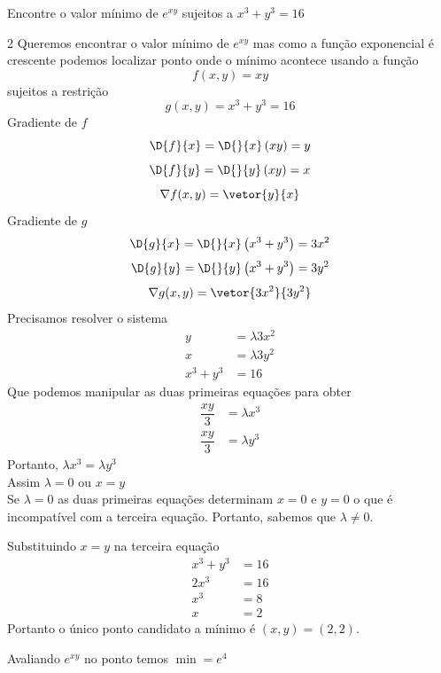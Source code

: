 \documentclass[a4paper,12pt,fleqn]{article}
\begin{document}
Encontre o valor mínimo de
\(
  e^{xy}
\)
sujeitos a
\(
  x^3 + y^3 = 16
\)
\clearpagequestiononly

\begin{answer}
  \setlength\columnsep{3em}
  \begin{multicols}{2}
    Queremos encontrar o valor mínimo de $e^{xy}$
    mas como a função exponencial é crescente podemos localizar  ponto
    onde o mínimo acontece usando a função
    \[
      f(x,y) = xy
    \]
    sujeitos a restrição
    \[
      g(x, y) = x^3 + y^3 = 16
    \]
    Gradiente de $f$
    \[
      \D{f}{x}
      = \D{}{x}\left(xy\right)
      = y
    \]
    \[
      \D{f}{y}
      = \D{}{y}\left(xy\right)
      = x
    \]
    \[
      \nabla f(x, y) = \vetor{y}{x}
    \]
    Gradiente de $g$
    \[
      \D{g}{x}
      = \D{}{x}\left(x^3 + y^3\right)
      = 3x^2
    \]
    \[
      \D{g}{y}
      = \D{}{y}\left(x^3 + y^3\right)
      = 3y^2
    \]
    \[
      \nabla g(x, y) = \vetor{3x^2}{3y^2}
    \]
    Precisamos resolver o sistema
    \begin{align*}
      y         & = \lambda 3x^2 \\
      x         & = \lambda 3y^2 \\
      x^3 + y^3 & = 16
    \end{align*}
    Que podemos manipular as duas primeiras equações para obter
    \begin{align*}
      \dfrac{xy}{3} & = \lambda x^3 \\
      \dfrac{xy}{3} & = \lambda y^3
    \end{align*}
    Portanto,
    \(
      \lambda x^3 = \lambda y^3
    \) \\
    Assim $\lambda=0$ ou $x=y$ \\
    Se $\lambda=0$ as duas primeiras equações
    determinam $x=0$ e $y=0$ o que é incompatível com a
    terceira equação. Portanto, sabemos que $\lambda\neq 0$.

    Substituindo $x=y$ na terceira equação
    \begin{align*}
      x^3 + y^3 & = 16 \\
      2x^3      & = 16 \\
      x^3       & = 8  \\
      x         & = 2
    \end{align*}
    Portanto o único ponto candidato a mínimo é $(x, y) = (2, 2)$.

    Avaliando $e^{xy}$ no ponto temos $\min = e^4$
  \end{multicols}
\end{answer}

\end{document}
